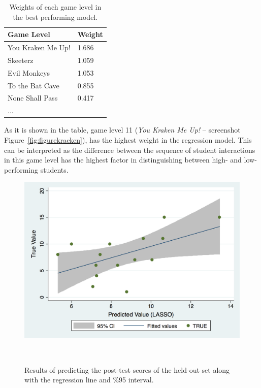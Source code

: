 \documentclass{sigchi}
\begin{document}
\begin{table}[b]
	\centering
	\begin{tabular}{ll}
		\hline
		\textbf{Game Level} & \textbf{Weight} \\ \hline
		You Kraken Me Up!   & 1.686                               \\
		Skeeterz            & 1.059                               \\
		Evil Monkeys        & 1.053                               \\
		To the Bat Cave     & 0.855                               \\
		None Shall Pass     & 0.417                               \\
		...                 &                                    
	\end{tabular}
	\caption{Weights of each game level in the best performing model.}
	\label{tab:regrweights}	
\end{table}

As it is shown in the table, game level 11 (\textit{You Kraken Me Up!} -- screenshot Figure~\ref{fig:figurekracken}), has the highest weight in the regression model. This can be interpreted as the difference between the sequence of student interactions in this game level has the highest factor in distinguishing between high- and low-performing students. 

\begin{figure}
	\centering
	\includegraphics[width=0.9\columnwidth]{figures/regression}
	\caption{Results of predicting the post-test scores of the held-out set along with the regression line and \%95 interval.}~\label{fig:regression}
\end{figure}
	
\end{document}
